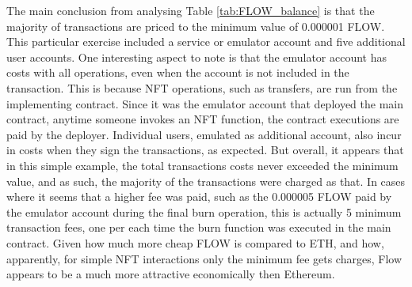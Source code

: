 \documentclass[../main.tex]{subfiles}
\begin{document}
The main conclusion from analysing Table \ref{tab:FLOW_balance} is that the majority of transactions are priced to the minimum value of 0.000001 FLOW. This particular exercise included a service or emulator account and five additional user accounts. One interesting aspect to note is that the emulator account has costs with all operations, even when the account is not included in the transaction. This is because NFT operations, such as transfers, are run from the implementing contract. Since it was the emulator account that deployed the main contract, anytime someone invokes an NFT function, the contract executions are paid by the deployer. Individual users, emulated as additional account, also incur in costs when they sign the transactions, as expected. But overall, it appears that in this simple example, the total transactions costs never exceeded the minimum value, and as such, the majority of the transactions were charged as that. In cases where it seems that a higher fee was paid, such as the 0.000005 FLOW paid by the emulator account during the final burn operation, this is actually 5 minimum transaction fees, one per each time the burn function was executed in the main contract. Given how much more cheap FLOW is compared to ETH, and how, apparently, for simple NFT interactions only the minimum fee gets charges, Flow appears to be a much more attractive economically then Ethereum.
\end{document}
